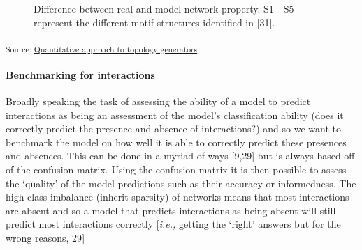 \documentclass[
]{article}
\let\oldparagraph\paragraph
\renewcommand{\paragraph}[1]{\oldparagraph{#1}\mbox{}}
\begin{document}
\begin{figure}[H]


\caption{\label{fig-topology}Difference between real and model network
property. S1 - S5 represent the different motif structures identified in
{[}31{]}.}

\end{figure}%

\textsubscript{Source:
\href{https://BecksLab.github.io/ms_t_is_for_topology/notebooks/model_quantitative-preview.html\#cell-fig-topology}{Quantitative
approach to topology generators}}

\paragraph{Benchmarking for
interactions}\label{benchmarking-for-interactions}

Broadly speaking the task of assessing the ability of a model to predict
interactions as being an assessment of the model's classification
ability (does it correctly predict the presence and absence of
interactions?) and so we want to benchmark the model on how well it is
able to correctly predict these presences and absences. This can be done
in a myriad of ways {[}9,29{]} but is always based off of the confusion
matrix. Using the confusion matrix it is then possible to assess the
`quality' of the model predictions such as their accuracy or
informedness. The high class imbalance (inherit sparsity) of networks
means that most interactions are absent and so a model that predicts
interactions as being absent will still predict most interactions
correctly {[}\emph{i.e.,} getting the `right' answers but for the wrong
reasons, 29{]}
\end{document}
